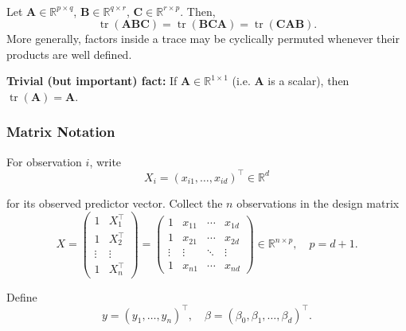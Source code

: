 \begin{theorem}\leavevmode\\
    Let $\bm{A} \in \mathbb{R}^{p \times q}$, $\bm{B} \in \mathbb{R}^{q \times r}$, $\bm{C} \in \mathbb{R}^{r \times p}$. Then,
    \begin{equation*}
        \operatorname{tr}(\bm{A}\bm{B}\bm{C}) = \operatorname{tr}(\bm{B}\bm{C}\bm{A}) = \operatorname{tr}(\bm{C}\bm{A}\bm{B}).
    \end{equation*}
    More generally, factors inside a trace may be cyclically permuted whenever their products are well defined.

    \vspace{0.5em}
    \noindent
    \textbf{Trivial (but important) fact:} If $\bm{A} \in \mathbb{R}^{1 \times 1}$ (i.e. $\bm{A}$ is a scalar), then $\operatorname{tr}(\bm{A}) = \bm{A}$.
\end{theorem}

\subsubsection{Matrix Notation}

For observation $i$, write
\begin{equation*}
    X_i = (x_{i1}, \dots, x_{id})^\top \in \mathbb{R}^d
\end{equation*}

for its observed predictor vector. Collect the $n$ observations in the design matrix
\begin{equation*}
    X = \begin{pmatrix}
        1 & X_1^\top \\
        1 & X_2^\top \\
        \vdots & \vdots \\
        1 & X_n^\top
    \end{pmatrix} = \begin{pmatrix}
        1 & x_{11} & \cdots & x_{1d} \\
        1 & x_{21} & \cdots & x_{2d} \\
        \vdots & \vdots & \ddots & \vdots \\
        1 & x_{n1} & \cdots & x_{nd}
    \end{pmatrix} \in \mathbb{R}^{n \times p}, \quad p = d+1.
\end{equation*}

Define
\begin{equation*}
    y = (y_1, \dots, y_n)^\top, \quad \beta = (\beta_0, \beta_1, \dots, \beta_d)^\top.
\end{equation*}

